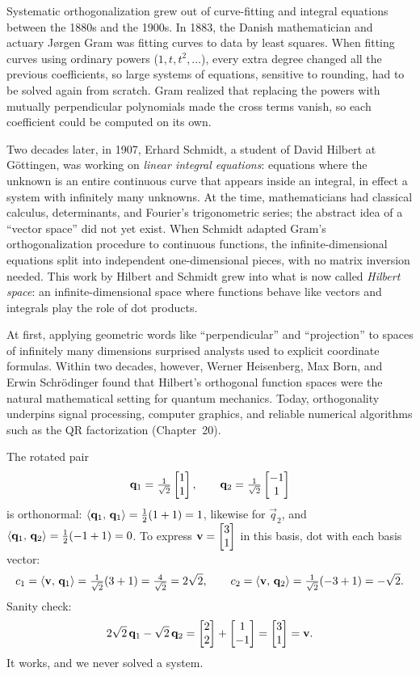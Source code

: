 \begin{historybox}
Systematic orthogonalization grew out of curve-fitting and integral equations between the 1880s and the 1900s. In 1883, the Danish mathematician and actuary J\o{}rgen Gram was fitting curves to data by least squares. When fitting curves using ordinary powers ($1, t, t^2, \dots$), every extra degree changed all the previous coefficients, so large systems of equations, sensitive to rounding, had to be solved again from scratch. Gram realized that replacing the powers with mutually perpendicular polynomials made the cross terms vanish, so each coefficient could be computed on its own.

Two decades later, in 1907, Erhard Schmidt, a student of David Hilbert at G\"ottingen, was working on \emph{linear integral equations}: equations where the unknown is an entire continuous curve that appears inside an integral, in effect a system with infinitely many unknowns. At the time, mathematicians had classical calculus, determinants, and Fourier's trigonometric series; the abstract idea of a ``vector space'' did not yet exist. When Schmidt adapted Gram's orthogonalization procedure to continuous functions, the infinite-dimensional equations split into independent one-dimensional pieces, with no matrix inversion needed. This work by Hilbert and Schmidt grew into what is now called \emph{Hilbert space}: an infinite-dimensional space where functions behave like vectors and integrals play the role of dot products.

At first, applying geometric words like ``perpendicular'' and ``projection'' to spaces of infinitely many dimensions surprised analysts used to explicit coordinate formulas. Within two decades, however, Werner Heisenberg, Max Born, and Erwin Schr\"odinger found that Hilbert's orthogonal function spaces were the natural mathematical setting for quantum mechanics. Today, orthogonality underpins signal processing, computer graphics, and reliable numerical algorithms such as the QR factorization (Chapter~20).
\end{historybox}

\begin{example}\label{ch17:rotated-basis}
The rotated pair
\[
  \mathbf{q}_1=\tfrac{1}{\sqrt2}\begin{bmatrix}1\\1\end{bmatrix},\qquad
  \mathbf{q}_2=\tfrac{1}{\sqrt2}\begin{bmatrix}-1\\1\end{bmatrix}
\]
is orthonormal: $\langle \mathbf{q}_1,\, \mathbf{q}_1 \rangle=\tfrac12(1+1)=1$, likewise for $\vec q_2$, and
$\langle \mathbf{q}_1,\, \mathbf{q}_2 \rangle=\tfrac12(-1+1)=0$. To express $\mathbf{v}=\begin{bmatrix}3\\1\end{bmatrix}$ in this basis,
dot with each basis vector:
\[
  c_1=\langle \mathbf{v},\, \mathbf{q}_1 \rangle=\tfrac{1}{\sqrt2}(3+1)=\tfrac{4}{\sqrt2}=2\sqrt2,\qquad
  c_2=\langle \mathbf{v},\, \mathbf{q}_2 \rangle=\tfrac{1}{\sqrt2}(-3+1)=-\sqrt2.
\]
Sanity check:
\[
  2\sqrt2\,\mathbf{q}_1 - \sqrt2\,\mathbf{q}_2 = \begin{bmatrix}2\\2\end{bmatrix}+\begin{bmatrix}1\\-1\end{bmatrix}=\begin{bmatrix}3\\1\end{bmatrix}=\mathbf{v}.
\]
It works, and we never solved a system.
\end{example}

